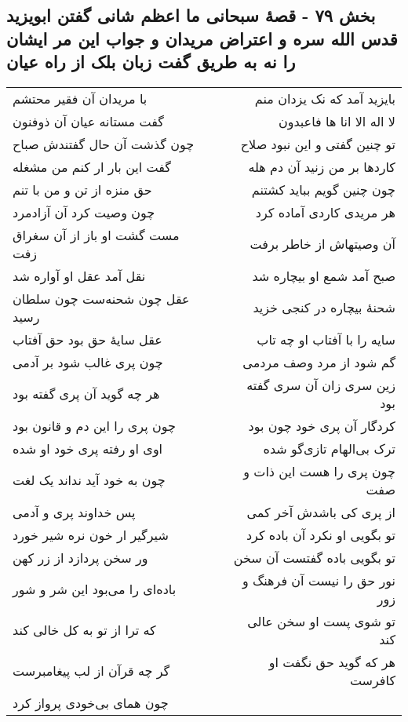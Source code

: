 \begin{center}
\section*{بخش ۷۹ - قصهٔ سبحانی ما اعظم شانی گفتن ابویزید قدس الله سره و اعتراض مریدان و جواب این مر ایشان را نه به طریق گفت زبان بلک از راه عیان}
\label{sec:sh079}
\begin{longtable}{l p{0.5cm} r}
با مریدان آن فقیر محتشم
&&
بایزید آمد که نک یزدان منم
\\
گفت مستانه عیان آن ذوفنون
&&
لا اله الا انا ها فاعبدون
\\
چون گذشت آن حال گفتندش صباح
&&
تو چنین گفتی و این نبود صلاح
\\
گفت این بار ار کنم من مشغله
&&
کاردها بر من زنید آن دم هله
\\
حق منزه از تن و من با تنم
&&
چون چنین گویم بباید کشتنم
\\
چون وصیت کرد آن آزادمرد
&&
هر مریدی کاردی آماده کرد
\\
مست گشت او باز از آن سغراق زفت
&&
آن وصیتهاش از خاطر برفت
\\
نقل آمد عقل او آواره شد
&&
صبح آمد شمع او بیچاره شد
\\
عقل چون شحنه‌ست چون سلطان رسید
&&
شحنهٔ بیچاره در کنجی خزید
\\
عقل سایهٔ حق بود حق آفتاب
&&
سایه را با آفتاب او چه تاب
\\
چون پری غالب شود بر آدمی
&&
گم شود از مرد وصف مردمی
\\
هر چه گوید آن پری گفته بود
&&
زین سری زان آن سری گفته بود
\\
چون پری را این دم و قانون بود
&&
کردگار آن پری خود چون بود
\\
اوی او رفته پری خود او شده
&&
ترک بی‌الهام تازی‌گو شده
\\
چون به خود آید نداند یک لغت
&&
چون پری را هست این ذات و صفت
\\
پس خداوند پری و آدمی
&&
از پری کی باشدش آخر کمی
\\
شیرگیر ار خون نره شیر خورد
&&
تو بگویی او نکرد آن باده کرد
\\
ور سخن پردازد از زر کهن
&&
تو بگویی باده گفتست آن سخن
\\
باده‌ای را می‌بود این شر و شور
&&
نور حق را نیست آن فرهنگ و زور
\\
که ترا از تو به کل خالی کند
&&
تو شوی پست او سخن عالی کند
\\
گر چه قرآن از لب پیغامبرست
&&
هر که گوید حق نگفت او کافرست
\\
چون همای بی‌خودی پرواز کرد

\end{longtable}
\end{center}
